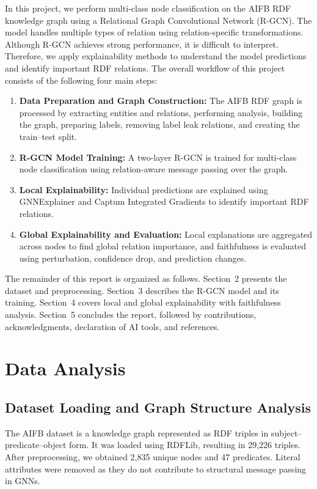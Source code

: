 \documentclass[runningheads]{llncs}
\begin{document}
In this project, we perform multi-class node classification on the AIFB RDF knowledge graph using a Relational Graph Convolutional Network (R-GCN). The model handles multiple types of relation using relation-specific transformations. Although R-GCN achieves strong performance, it is difficult to interpret. Therefore, we apply explainability methods to understand the model predictions and identify important RDF relations.
The overall workflow of this project consists of the following four main steps:

\begin{enumerate}
    \item \textbf{Data Preparation and Graph Construction:} The AIFB RDF graph is processed by extracting entities and relations, performing analysis, building the graph, preparing labels, removing label leak relations, and creating the train--test split.

    \item \textbf{R-GCN Model Training:} A two-layer R-GCN is trained for multi-class node classification using relation-aware message passing over the graph.

    \item \textbf{Local Explainability:} Individual predictions are explained using GNNExplainer and Captum Integrated Gradients to identify important RDF relations.

    \item \textbf{Global Explainability and Evaluation:} Local explanations are aggregated across nodes to find global relation importance, and faithfulness is evaluated using perturbation, confidence drop, and prediction changes.
\end{enumerate}
The remainder of this report is organized as follows. Section~2 presents the dataset and preprocessing. Section~3 describes the R-GCN model and its training. Section~4 covers local and global explainability with faithfulness analysis. Section~5 concludes the report, followed by contributions, acknowledgments, declaration of AI tools, and references.
\section{Data Analysis}
\subsection{Dataset Loading and Graph Structure Analysis}

The AIFB dataset is a knowledge graph represented as RDF triples in subject--predicate--object form. It was loaded using RDFLib, resulting in 29,226 triples. After preprocessing, we obtained 2,835 unique nodes and 47 predicates. Literal attributes were removed as they do not contribute to structural message passing in GNNs.
\end{document}
